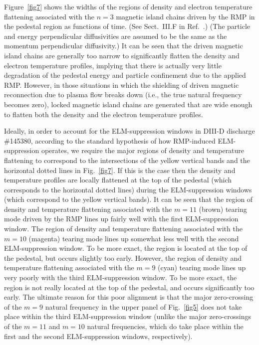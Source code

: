 \documentclass[12pt,prb,aps]{revtex4-1}
\begin{document}
Figure~\ref{fig7} shows the widths of the regions of density and electron temperature flattening associated with the $n=3$ magnetic
island chains driven by the RMP in the pedestal region as functions of time. (See Sect.~III.F in Ref.~.) (The particle and energy perpendicular diffusivities are assumed to be the
same as the momentum perpendicular diffusivity.) It can be seen that the driven magnetic island chains are generally too narrow
to significantly flatten the density and electron temperature profiles,\cite{flat}  implying that there is actually very little degradation of the pedestal energy and particle confinement
due to the applied RMP. 
However, in those situations in which the shielding of driven
magnetic reconnection due to plasma flow breaks down (i.e., the true natural frequency becomes zero), locked magnetic island chains are generated that are
 wide enough to flatten both the density and the electron temperature profiles. 
 
 Ideally, in order to account for the
ELM-suppression windows in DIII-D discharge \#145380, according to the standard
hypothesis of how RMP-induced ELM-suppression operates, we require the major regions of density and temperature
flattening to correspond to the intersections of the yellow vertical bands and the horizontal dotted lines in Fig.~\ref{fig7}. If this is the case then
the density and temperature profiles are locally flattened at the top of the pedestal (which corresponds to
the horizontal dotted lines) during the ELM-suppression windows (which correspond to the yellow vertical bands). It can be seen
that the region of density and temperature flattening associated with the $m=11$ (brown) tearing mode driven by the RMP lines up fairly well with the
first ELM-suppression window. The region of density and temperature flattening associated with the $m=10$ (magenta) tearing mode 
lines up somewhat less well with the second ELM-suppression window. To be more exact, the region is located at the top of the pedestal,
but occurs slightly too early. However, the 
region of density and temperature flattening associated with the $m=9$ (cyan) tearing mode 
lines up very poorly with the third ELM-suppression window. To be more exact, the region is not really located at the top of the pedestal, and occurs
significantly too early. The ultimate reason for this poor alignment is that the major zero-crossing of the $m=9$ natural
frequency in the upper panel of Fig.~\ref{fig5} does not take place within the third ELM-suppression window (unlike the
major zero-crossings of the $m=11$ and $m=10$ natural frequencies, which do take place within the first and the second
ELM-suppression windows, respectively). 
\end{document}
